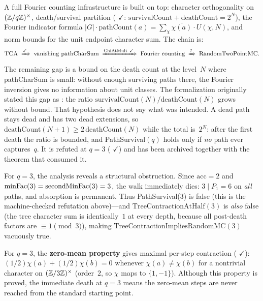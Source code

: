 A full Fourier counting infrastructure is built on top: character
orthogonality on $(\mathbb{Z}/q\mathbb{Z})^\times$, death/survival partition
(
{\color{leanink}$\checkmark$}:
$\mathrm{survivalCount} + \mathrm{deathCount} = 2^N$),
the Fourier indicator formula
$|G| \cdot \mathrm{pathCount}(a)
= \sum_\chi \overline{\chi(a)} \cdot U(\chi, N)$,
and norm bounds for the unit endpoint character sum.
The chain is:
\[
  \mathrm{TCA}
  \;\xRightarrow{\checkmark}\;
  \text{vanishing pathCharSum}
  \;\xRightarrow{\text{ChiAtMult}\ \checkmark}\;
  \text{Fourier counting}
  \;\xRightarrow{?}\;
  \text{RandomTwoPointMC}.
\]
The remaining gap is a bound on the death count at the level~$N$ where
pathCharSum is small: without enough surviving paths there, the Fourier
inversion gives no information about unit classes.  The formalization
originally stated this gap as : the ratio
$\mathrm{survivalCount}(N) / \mathrm{deathCount}(N)$ grows without
bound.  That hypothesis does not say what was intended.  A dead path
stays dead and has two dead extensions, so
$\mathrm{deathCount}(N{+}1) \geq 2\,\mathrm{deathCount}(N)$ while the
total is~$2^N$: after the first death the ratio is bounded, and
PathSurvival$(q)$ holds only if \emph{no} path ever captures~$q$.  It
is refuted at $q = 3$
(
{\color{leanink}$\checkmark$}) and has been archived together with
the theorem that consumed it.

For $q = 3$, the analysis reveals a structural obstruction.
Since $\mathrm{acc} = 2$ and $\mathrm{minFac}(3) = \operatorname{secondMinFac}(3) = 3$,
the walk immediately dies: $3 \mid P_1 = 6$ on \emph{all} paths,
and absorption is permanent.
Thus PathSurvival(3) is false (this is the machine-checked
refutation above)---and
$\mathrm{TreeContractionAtHalf}(3)$ is \emph{also} false (the tree
character sum is identically~$1$ at every depth, because all
post-death factors are $\equiv 1 \pmod{3}$), making
$\mathrm{TreeContractionImpliesRandomMC}(3)$ vacuously true.

For $q = 3$, the \textbf{zero-mean property} gives maximal per-step
contraction
(
{\color{leanink}$\checkmark$}):
$(1/2)\chi(a) + (1/2)\chi(b) = 0$ whenever $\chi(a) \neq \chi(b)$
for a nontrivial character on $(\mathbb{Z}/3\mathbb{Z})^\times$ (order~$2$, so
$\chi$ maps to $\{1, -1\}$).  Although this property is proved,
the immediate death at $q = 3$ means the zero-mean steps are
never reached from the standard starting point.

